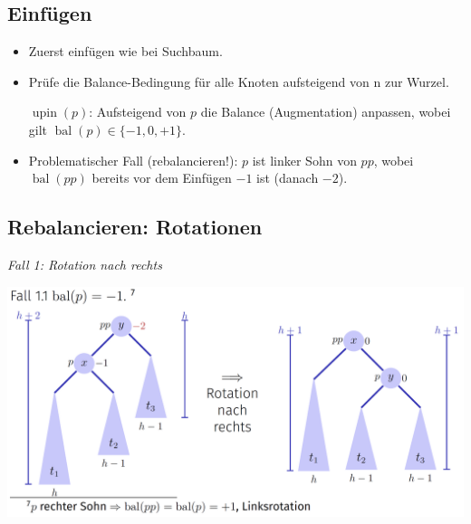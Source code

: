 \vspace{-4pt}
\begin{sectionbox}
\subsection{Einfügen}\smallskip
\begin{itemize}
    \item Zuerst einfügen wie bei Suchbaum.
    \item Prüfe die Balance-Bedingung für alle Knoten aufsteigend von n zur Wurzel.
    \par \textbf{$\operatorname{upin}(p)$}: Aufsteigend von $p$ die Balance (Augmentation) anpassen, wobei gilt $\operatorname{bal}(p) \in \{-1,0,+1\}$.
    \item Problematischer Fall (rebalancieren!): $p$ ist linker Sohn von $pp$, wobei $\operatorname{bal}(pp)$ bereits vor dem Einfügen $-1$ ist (danach $-2$).
\end{itemize}\par\smallskip
\end{sectionbox}
\vspace{-4pt}
\begin{sectionbox}
\subsection{Rebalancieren: Rotationen}\smallskip
\textit{Fall 1: Rotation nach rechts}\par
\begin{center}
    \includegraphics[width = \columnwidth]{../img/rotR.png}
\end{center}\smallskip
\end{sectionbox}
\vspace{-4pt}
